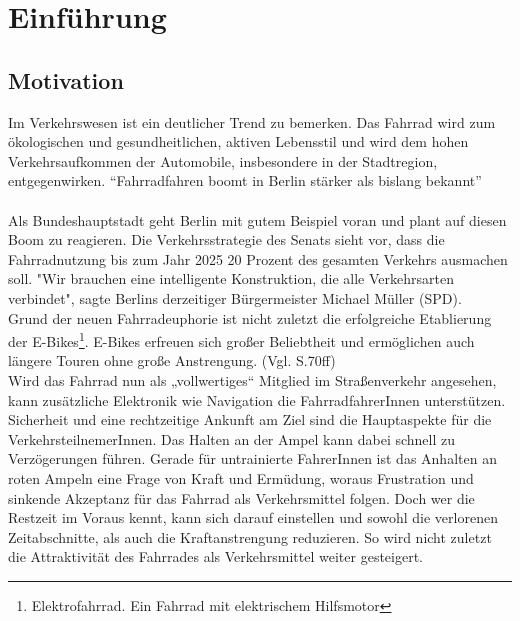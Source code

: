 \chapter{\label{chap:einleitung}Einführung}
\section{Motivation}
Im Verkehrswesen ist ein deutlicher Trend zu bemerken. Das Fahrrad wird zum ökologischen und gesundheitlichen, aktiven Lebensstil und wird dem hohen Verkehrsaufkommen der Automobile, insbesondere in der Stadtregion, entgegenwirken. “Fahrradfahren boomt in Berlin stärker als bislang bekannt”\cite{Mopo}\\\\
Als Bundeshauptstadt geht Berlin mit gutem Beispiel voran und plant auf diesen Boom zu reagieren. Die Verkehrsstrategie des Senats sieht vor, dass die Fahrradnutzung bis zum Jahr 2025 20 Prozent des gesamten Verkehrs ausmachen soll. "Wir brauchen eine intelligente Konstruktion, die alle Verkehrsarten verbindet", sagte Berlins derzeitiger Bürgermeister Michael Müller (SPD). \cite{Mopo}\\
Grund der neuen Fahrradeuphorie ist nicht zuletzt die erfolgreiche Etablierung der E-Bikes\footnote{ Elektrofahrrad. Ein Fahrrad mit elektrischem Hilfsmotor}. E-Bikes erfreuen sich großer Beliebtheit und ermöglichen auch längere Touren ohne große Anstrengung. (Vgl. \cite{ebikes} S.70ff)\\ 
Wird das Fahrrad nun als „vollwertiges“ Mitglied im Straßenverkehr angesehen, kann zusätzliche Elektronik wie Navigation die FahrradfahrerInnen unterstützen. Sicherheit und eine rechtzeitige Ankunft am Ziel sind die Hauptaspekte für die VerkehrsteilnemerInnen. Das Halten an der Ampel kann dabei schnell zu Verzögerungen führen. Gerade für untrainierte FahrerInnen ist das Anhalten an roten Ampeln eine Frage von Kraft und Ermüdung, woraus Frustration und sinkende Akzeptanz für das Fahrrad als Verkehrsmittel folgen. Doch wer die Restzeit im Voraus kennt, kann sich darauf einstellen und sowohl die verlorenen Zeitabschnitte, als auch die Kraftanstrengung reduzieren. So wird nicht zuletzt die Attraktivität des Fahrrades als Verkehrsmittel weiter gesteigert. 
